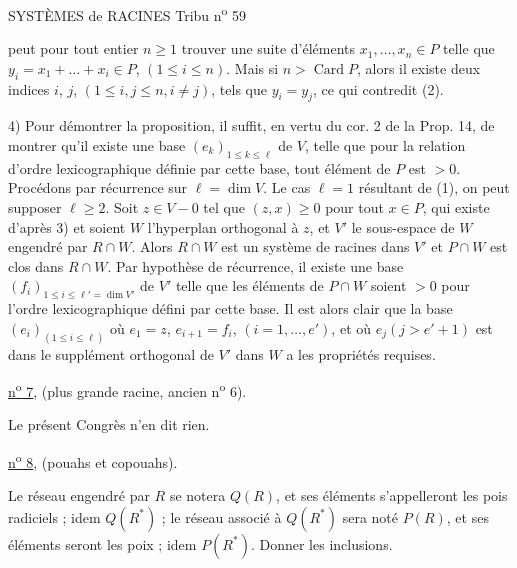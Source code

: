 SYSTÈMES de RACINES \hfill Tribu n\textsuperscript{o} 59

peut pour tout entier $n\geq 1$ trouver une suite d'éléments $x_1,\ldots,x_n\in P$ telle que $y_i=x_1+\ldots+x_i\in P$, $(1\leq i\leq n)$. Mais si $n>\operatorname{Card}P$, alors il existe deux indices $i$, $j$, $(1\leq i,j\leq n,i\neq j)$, tels que $y_i=y_j$, ce qui contredit (2).

4) Pour démontrer la proposition, il suffit, en vertu du cor. 2 de la Prop. 14, de montrer qu'il existe une base $(e_k)_{1\leq k\leq\ell}$ de $V$, telle que pour la relation d'ordre lexicographique définie par cette base, tout élément de $P$ est $>0$. Procédons par récurrence sur $\ell=\dim V$. Le cas $\ell=1$ résultant de (1), on peut supposer $\ell\geq 2$. Soit $z\in V-0$ tel que $(z,x)\geq 0$ pour tout $x\in P$, qui existe d'après 3) et soient $W$ l'hyperplan orthogonal à $z$, et $V'$ le sous-espace de $W$ engendré par $R\cap W$. Alors $R\cap W$ est un système de racines dans $V'$ et $P\cap W$ est clos dans $R\cap W$. Par hypothèse de récurrence, il existe une base $(f_i)_{1\leq i\leq\ell'=\dim V'}$ de $V'$ telle que les éléments de $P\cap W$ soient $>0$ pour l'ordre lexicographique défini par cette base. Il est alors clair que la base $(e_i)_{(1\leq i\leq\ell)}$ où $e_1=z$, $e_{i+1}=f_i$, $(i=1,\ldots,e')$, et où $e_j(j>e'+1)$ est dans le supplément orthogonal de $V'$ dans $W$ a les propriétés requises.

\uline{n\textsuperscript{o} 7}, (plus grande racine, ancien n\textsuperscript{o} 6).

Le présent Congrès n'en dit rien.

\uline{n\textsuperscript{o} 8}, (pouahs et copouahs).

Le réseau engendré par $R$ se notera $Q(R)$, et ses éléments s'appelleront les pois radiciels ; idem $Q(R^*)$ ; le réseau associé à $Q(R^*)$ sera noté $P(R)$, et ses éléments seront les poix ; idem $P(R^*)$. Donner les inclusions.


